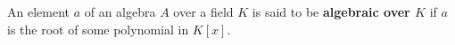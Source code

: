 An element $a$ of an algebra $A$ over a field $K$ is said to be \textbf{algebraic over $K$} if $a$ is the root of some polynomial in $K[x]$.
